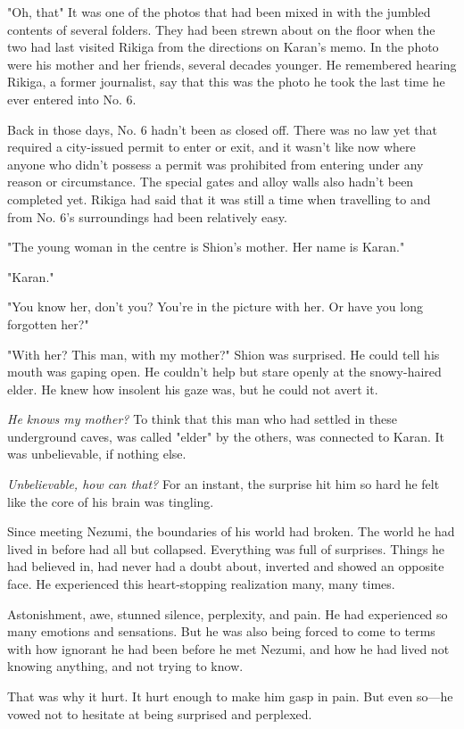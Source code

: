"Oh, that\el " It was one of the photos that had been mixed in with the
jumbled contents of several folders. They had been strewn about on the
floor when the two had last visited Rikiga from the directions on
Karan's memo. In the photo were his mother and her friends, several
decades younger. He remembered hearing Rikiga, a former journalist, say
that this was the photo he took the last time he ever entered into No.
6.

Back in those days, No. 6 hadn't been as closed off. There was no law
yet that required a city-issued permit to enter or exit, and it wasn't
like now where anyone who didn't possess a permit was prohibited from
entering under any reason or circumstance. The special gates and alloy
walls also hadn't been completed yet. Rikiga had said that it was still
a time when travelling to and from No. 6's surroundings had been
relatively easy.

"The young woman in the centre is Shion's mother. Her name is Karan."

"Karan."

"You know her, don't you? You're in the picture with her. Or have you
long forgotten her?"

"With her? This man, with my mother?" Shion was surprised. He could tell
his mouth was gaping open. He couldn't help but stare openly at the
snowy-haired elder. He knew how insolent his gaze was, but he could not
avert it.

\emph{He knows my mother?} To think that this man who had settled in these
underground caves, was called "elder" by the others, was connected to
Karan. It was unbelievable, if nothing else.

\emph{Unbelievable, how can that\el ?} For an instant, the surprise hit him so
hard he felt like the core of his brain was tingling.

Since meeting Nezumi, the boundaries of his world had broken. The world
he had lived in before had all but collapsed. Everything was full of
surprises. Things he had believed in, had never had a doubt about,
inverted and showed an opposite face. He experienced this heart-stopping
realization many, many times.

Astonishment, awe, stunned silence, perplexity, and pain. He had
experienced so many emotions and sensations. But he was also being
forced to come to terms with how ignorant he had been before he met
Nezumi, and how he had lived not knowing anything, and not trying to
know.

That was why it hurt. It hurt enough to make him gasp in pain. But even
so---he vowed not to hesitate at being surprised and perplexed.

